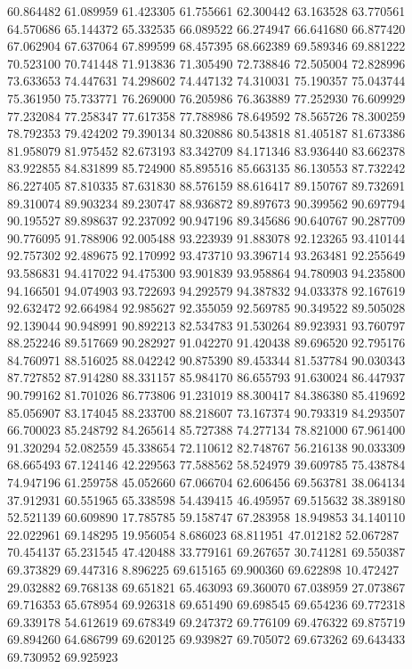 60.864482
61.089959
61.423305
61.755661
62.300442
63.163528
63.770561
64.570686
65.144372
65.332535
66.089522
66.274947
66.641680
66.877420
67.062904
67.637064
67.899599
68.457395
68.662389
69.589346
69.881222
70.523100
70.741448
71.913836
71.305490
72.738846
72.505004
72.828996
73.633653
74.447631
74.298602
74.447132
74.310031
75.190357
75.043744
75.361950
75.733771
76.269000
76.205986
76.363889
77.252930
76.609929
77.232084
77.258347
77.617358
77.788986
78.649592
78.565726
78.300259
78.792353
79.424202
79.390134
80.320886
80.543818
81.405187
81.673386
81.958079
81.975452
82.673193
83.342709
84.171346
83.936440
83.662378
83.922855
84.831899
85.724900
85.895516
85.663135
86.130553
87.732242
86.227405
87.810335
87.631830
88.576159
88.616417
89.150767
89.732691
89.310074
89.903234
89.230747
88.936872
89.897673
90.399562
90.697794
90.195527
89.898637
92.237092
90.947196
89.345686
90.640767
90.287709
90.776095
91.788906
92.005488
93.223939
91.883078
92.123265
93.410144
92.757302
92.489675
92.170992
93.473710
93.396714
93.263481
92.255649
93.586831
94.417022
94.475300
93.901839
93.958864
94.780903
94.235800
94.166501
94.074903
93.722693
94.292579
94.387832
94.033378
92.167619
92.632472
92.664984
92.985627
92.355059
92.569785
90.349522
89.505028
92.139044
90.948991
90.892213
82.534783
91.530264
89.923931
93.760797
88.252246
89.517669
90.282927
91.042270
91.420438
89.696520
92.795176
84.760971
88.516025
88.042242
90.875390
89.453344
81.537784
90.030343
87.727852
87.914280
88.331157
85.984170
86.655793
91.630024
86.447937
90.799162
81.701026
86.773806
91.231019
88.300417
84.386380
85.419692
85.056907
83.174045
88.233700
88.218607
73.167374
90.793319
84.293507
66.700023
85.248792
84.265614
85.727388
74.277134
78.821000
67.961400
91.320294
52.082559
45.338654
72.110612
82.748767
56.216138
90.033309
68.665493
67.124146
42.229563
77.588562
58.524979
39.609785
75.438784
74.947196
61.259758
45.052660
67.066704
62.606456
69.563781
38.064134
37.912931
60.551965
65.338598
54.439415
46.495957
69.515632
38.389180
52.521139
60.609890
17.785785
59.158747
67.283958
18.949853
34.140110
22.022961
69.148295
19.956054
8.686023
68.811951
47.012182
52.067287
70.454137
65.231545
47.420488
33.779161
69.267657
30.741281
69.550387
69.373829
69.447316
8.896225
69.615165
69.900360
69.622898
10.472427
29.032882
69.768138
69.651821
65.463093
69.360070
67.038959
27.073867
69.716353
65.678954
69.926318
69.651490
69.698545
69.654236
69.772318
69.339178
54.612619
69.678349
69.247372
69.776109
69.476322
69.875719
69.894260
64.686799
69.620125
69.939827
69.705072
69.673262
69.643433
69.730952
69.925923
